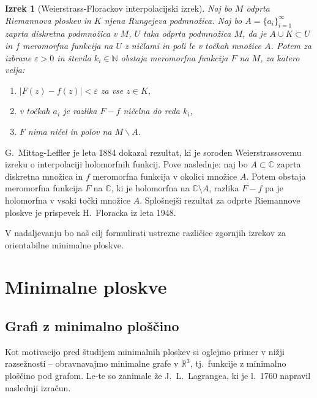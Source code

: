 \documentclass[12pt,a4paper,twoside]{article}
\theoremstyle{definition} %
\theoremstyle{plain} %
\newtheorem{izrek}[definicija]{Izrek}
\numberwithin{equation}{section}  %
\newcommand{\R}{\mathbb R}
\newcommand{\N}{\mathbb N}
\newcommand{\C}{\mathbb C}
\begin{document}
\begin{izrek} [Weierstrass-Florackov interpolacijski izrek] \label{izr:Weierstrass-Florack}
Naj bo $M$ odprta Riemannova ploskev in $K$ njena Rungejeva podmnožica. Naj bo $A = \{ a_i \}_{i=1}^{\infty}$ zaprta diskretna podmnožica v $M$, $U$ taka odprta podmnožica $M$, da je $A \cup K \subset U$ in $f$ meromorfna funkcija na $U$ z ničlami in poli le v točkah množice $A$.
Potem za izbrane $\varepsilon > 0$ in števila $k_{i} \in \N$ obstaja meromorfna funkcija $F$ na $M$, za katero velja:
\begin{enumerate}
\item $|F(z) - f(z)| < \varepsilon$ za vse $z \in K$,
\item v točkah $a_i$ je razlika $F-f$ ničelna do reda $k_i$,
\item $F$ nima ničel in polov na $M \backslash A$.
\end{enumerate} 
\end{izrek}

G.~Mittag-Leffler je leta 1884 dokazal rezultat, ki je soroden Weierstrassovemu izreku o interpolaciji holomorfnih funkcij. Pove naslednje:
naj bo $A \subset \C$ zaprta diskretna množica in $f$ meromorfna funkcija v okolici množice $A$. Potem obstaja meromorfna funkcija $F$ na $\C$, ki je holomorfna na $\C \setminus A$, razlika $F-f$ pa je holomorfna v vsaki točki množice $A$. \newline
Splošnejši rezultat za odprte Riemannove ploskve je prispevek H.~Floracka iz leta 1948. \newline

V nadaljevanju bo naš cilj formulirati ustrezne različice zgornjih izrekov za orientabilne minimalne ploskve.

\clearpage
\section{Minimalne ploskve}

\subsection{Grafi z minimalno ploščino}
%
Kot motivacijo pred študijem minimalnih ploskev si oglejmo primer v nižji razsežnosti -- obravnavajmo minimalne grafe v $\R^3$, tj.~funkcije z minimalno ploščino pod grafom. Le-te so zanimale že J.~L.~Lagrangea, ki je l.~1760 napravil naslednji izračun. 
\end{document}
